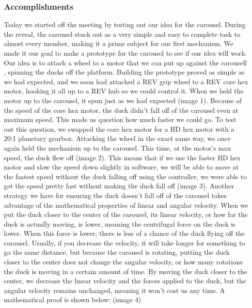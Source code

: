 \subsubsection*{Accomplishments}
Today we started off the meeting by testing out our idea for the carousel. During the reveal, the carousel stuck out as a very simple and easy to complete task to almost every member, making it a prime subject for our first mechanism. We made it our goal to make a prototype for the carousel to see if our idea will work. Our idea is to attach a wheel to a motor that we can put up against the carousell , spinning the ducks off the platform. Building the prototype proved as simple as we had expected, and we soon had attached a REV grip wheel to a REV core hex motor, hooking it all up to a REV hub so we could control it. When we held the motor up to the carousel, it spun just as we had expected (image 1). Because of the speed of the core hex motor, the duck didn’t fall off of the carousel even at maximum speed. This made us question how much faster we could go. To test out this question, we swapped the core hex motor for a HD hex motor with a 20:1 planetary gearbox. Attaching the wheel in the exact same way, we once again held the mechanism up to the carousel. This time, at the motor’s max speed, the duck flew off (image 2). This means that if we use the faster HD hex motor and slow the speed down slightly in software, we will be able to move at the fastest speed without the duck falling off using the controller, we were able to get the speed pretty fast without making the duck fall off (image 3). 
Another strategy we have for ensuring the duck doesn’t fall off of the carousel takes advantage of the mathematical properties of linear and angular velocity. When we put the duck closer to the center of the carousel, its linear velocity, or how far the duck is actually moving, is lower, meaning the centrifugal force on the duck is lower. When this force is lower, there is less of a chance of the duck flying off the carousel. Usually, if you decrease the velocity, it will take longer for something to go the same distance, but because the carousel is rotating, putting the duck closer to the center does not change the angular velocity, or how many rotations the duck is moving in a certain amount of time. By moving the duck closer to the center, we decrease the linear velocity and the forces applied to the duck, but the angular velocity remains unchanged, meaning it won’t cost us any time. A mathematical proof is shown below: (image 4)

